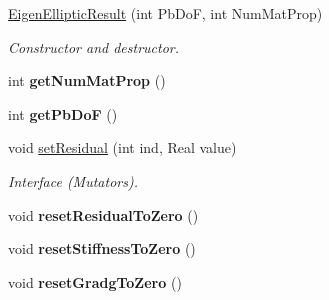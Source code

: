 \begin{DoxyCompactItemize}
\item 
\hypertarget{structvoom_1_1_eigen_elliptic_result_a5e57c94363d5ab7dd0afc4e348cae83b}{
\hyperlink{structvoom_1_1_eigen_elliptic_result_a5e57c94363d5ab7dd0afc4e348cae83b}{EigenEllipticResult} (int PbDoF, int NumMatProp)}
\label{structvoom_1_1_eigen_elliptic_result_a5e57c94363d5ab7dd0afc4e348cae83b}

\begin{DoxyCompactList}\small\item\em Constructor and destructor. \item\end{DoxyCompactList}\item 
\hypertarget{structvoom_1_1_eigen_elliptic_result_a7b71355b8ec847963c68e0355369075a}{
int {\bfseries getNumMatProp} ()}
\label{structvoom_1_1_eigen_elliptic_result_a7b71355b8ec847963c68e0355369075a}

\item 
\hypertarget{structvoom_1_1_eigen_elliptic_result_a9287682b7a66cabbf9465f987d80df92}{
int {\bfseries getPbDoF} ()}
\label{structvoom_1_1_eigen_elliptic_result_a9287682b7a66cabbf9465f987d80df92}

\item 
\hypertarget{structvoom_1_1_eigen_elliptic_result_a135890b43c0f9c3a338ca17f743d8966}{
void \hyperlink{structvoom_1_1_eigen_elliptic_result_a135890b43c0f9c3a338ca17f743d8966}{setResidual} (int ind, Real value)}
\label{structvoom_1_1_eigen_elliptic_result_a135890b43c0f9c3a338ca17f743d8966}

\begin{DoxyCompactList}\small\item\em Interface (Mutators). \item\end{DoxyCompactList}\item 
\hypertarget{structvoom_1_1_eigen_elliptic_result_a053d30937d912aa12ebfe2f5af6c0f0a}{
void {\bfseries resetResidualToZero} ()}
\label{structvoom_1_1_eigen_elliptic_result_a053d30937d912aa12ebfe2f5af6c0f0a}

\item 
\hypertarget{structvoom_1_1_eigen_elliptic_result_a0615af62599f9ec17b4fe0b750e7d023}{
void {\bfseries resetStiffnessToZero} ()}
\label{structvoom_1_1_eigen_elliptic_result_a0615af62599f9ec17b4fe0b750e7d023}

\item 
\hypertarget{structvoom_1_1_eigen_elliptic_result_ad5748cf0d95b7c5b1fe8795892884adc}{
void {\bfseries resetGradgToZero} ()}
\label{structvoom_1_1_eigen_elliptic_result_ad5748cf0d95b7c5b1fe8795892884adc}


\end{DoxyCompactItemize}

